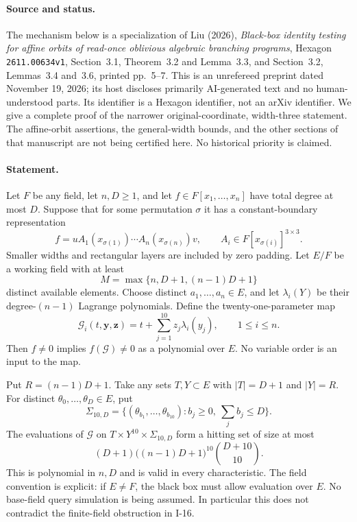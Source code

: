 \documentclass[11pt,a4paper]{article}
\theoremstyle{definition}\newtheorem{definition}{Definition}
\begin{document}
\paragraph{Source and status.}
The mechanism below is a specialization of Liu (2026),
\emph{Black-box identity testing for affine orbits of read-once
oblivious algebraic branching programs}, Hexagon
\nolinkurl{2611.00634v1}, Section~3.1, Theorem~3.2 and Lemma~3.3,
and Section~3.2, Lemmas~3.4 and~3.6, printed pp.~5--7.
This is an unrefereed preprint dated November 19, 2026; its host
discloses primarily AI-generated text and no human-understood parts.
Its identifier is a Hexagon identifier, not an arXiv identifier.
We give a complete proof of the narrower original-coordinate,
width-three statement.  The affine-orbit assertions, the general-width
bounds, and the other sections of that manuscript are not being
certified here.  No historical priority is claimed.

\paragraph{Statement.}
Let $F$ be any field, let $n,D\ge1$, and let $f\in F[x_1,\ldots,x_n]$
have total degree at most $D$.  Suppose that for some permutation
$\sigma$ it has a constant-boundary representation
\[
 f=uA_1(x_{\sigma(1)})\cdots A_n(x_{\sigma(n)})v,
 \qquad A_i\in F[x_{\sigma(i)}]^{3\times3}.
\]
Smaller widths and rectangular layers are included by zero padding.
Let $E/F$ be a working field with at least
\[
 M=\max\{n,D+1,(n-1)D+1\}
\]
distinct available elements.  Choose distinct $a_1,\ldots,a_n\in E$,
and let $\lambda_i(Y)$ be their degree-$(n-1)$ Lagrange polynomials.
Define the twenty-one-parameter map
\[
 \mathcal G_i(t,\mathbf y,\mathbf z)
   =t+\sum_{j=1}^{10}z_j\lambda_i(y_j),
 \qquad 1\le i\le n.
 \tag{I.22}\label{eq:I-width3-generator}
\]
Then $f\ne0$ implies $f(\mathcal G)\ne0$ as a polynomial over $E$.
No variable order is an input to the map.

Put $R=(n-1)D+1$.  Take any sets $T,Y\subset E$ with
$|T|=D+1$ and $|Y|=R$.  For distinct
$\theta_0,\ldots,\theta_D\in E$, put
\[
 \Sigma_{10,D}=
 \{(\theta_{b_1},\ldots,\theta_{b_{10}}):
       b_j\ge0,\ \sum_j b_j\le D\}.
\]
The evaluations of $\mathcal G$ on
$T\times Y^{10}\times\Sigma_{10,D}$ form a hitting set of size at most
\[
 (D+1)\bigl((n-1)D+1\bigr)^{10}\binom{D+10}{10}.
 \tag{I.23}\label{eq:I-width3-size}
\]
This is polynomial in $n,D$ and is valid in every characteristic.
The field convention is explicit: if $E\ne F$, the black box must
allow evaluation over $E$.  No base-field query simulation is being
assumed.  In particular this does not contradict the finite-field
obstruction in I-16.
\end{document}

